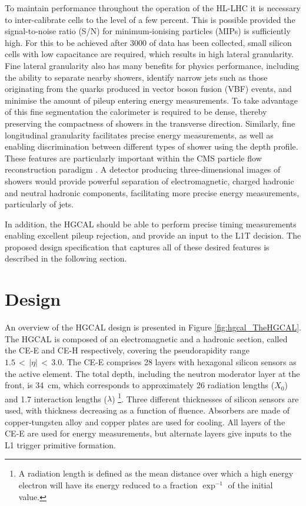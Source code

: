 To maintain performance throughout the operation of the HL-LHC it is necessary 
to inter-calibrate cells to the level of a few percent.
This is possible provided the signal-to-noise ratio (S/N) 
for minimum-ionising particles (MIPs) is sufficiently high.
For this to be achieved after \SI{3000}{\fbinv} of data has been collected, 
small silicon cells with low capacitance are required, which results in high lateral granularity.
Fine lateral granularity also has many benefits for physics performance, 
including the ability to separate nearby showers, identify narrow jets 
such as those originating from the quarks produced in vector boson fusion (VBF) events, 
and minimise the amount of pileup entering energy measurements.
To take advantage of this fine segmentation the calorimeter is required to be dense, 
thereby preserving the compactness of showers in the transverse direction.
Similarly, fine longitudinal granularity facilitates precise energy measurements, 
as well as enabling discrimination between different types of shower using the depth profile.
These features are particularly important 
within the CMS particle flow reconstruction paradigm \cite{ParticleFlow}.
A detector producing three-dimensional images of showers would provide 
powerful separation of electromagnetic, charged hadronic and neutral hadronic components,
facilitating more precise energy measurements, particularly of jets.

In addition, the HGCAL should be able to perform precise timing measurements 
enabling excellent pileup rejection, and provide an input to the L1T decision.
The proposed design specification that captures all of these desired features 
is described in the following section.

\section{Design}

An overview of the HGCAL design is presented in Figure \ref{fig:hgcal_TheHGCAL}.
The HGCAL is composed of an electromagnetic and a hadronic section, called the CE-E and CE-H respectively, covering the pseudorapidity range $1.5\,<\,|\eta|\,<\,3.0$.
The CE-E comprises 28 layers with hexagonal silicon sensors as the active element.
The total depth, including the neutron moderator layer at the front, is \SI{34}{cm}, 
which corresponds to approximately 26 radiation lengths ($X_0$) 
and 1.7 interaction lengths ($\lambda$)
\footnote{A radiation length is defined as the mean distance over which 
a high energy electron will have its energy reduced to a fraction $\exp^{-1}$ of the initial value.}.
Three different thicknesses of silicon sensors are used, with thickness decreasing as a function of fluence.
Absorbers are made of copper-tungsten alloy and copper plates are used for cooling.
All layers of the CE-E are used for energy measurements, but alternate layers give inputs to the L1 trigger primitive formation. %

